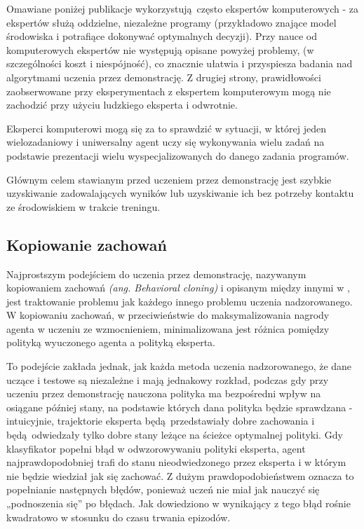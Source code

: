 Omawiane poniżej publikacje wykorzystują często ekspertów komputerowych - za ekspertów służą oddzielne, niezależne programy (przykładowo znające model środowiska i potrafiące dokonywać optymalnych decyzji). Przy nauce od komputerowych ekspertów nie występują opisane powyżej problemy, (w szczególności koszt i niespójność), co znacznie ułatwia i przyspiesza badania nad algorytmami uczenia przez demonstrację. Z drugiej strony, prawidłowości zaobserwowane przy eksperymentach z ekspertem komputerowym mogą nie zachodzić przy użyciu ludzkiego eksperta i odwrotnie.

Eksperci komputerowi mogą się za to sprawdzić w sytuacji, w której jeden wielozadaniowy i uniwersalny agent uczy się wykonywania wielu zadań na podstawie prezentacji wielu wyspecjalizowanych do danego zadania programów.

Głównym celem stawianym przed uczeniem przez demonstrację jest szybkie uzyskiwanie zadowalających wyników lub uzyskiwanie ich bez potrzeby kontaktu ze środowiskiem w trakcie treningu.

\subsection{Kopiowanie zachowań}\label{bcloning}

Najprostszym podejściem do uczenia przez demonstrację, nazywanym kopiowaniem zachowań \textit{(ang. Behavioral cloning)} i opisanym między innymi w \cite{Schaal99isimitation}, jest traktowanie problemu jak każdego innego problemu uczenia nadzorowanego. W kopiowaniu zachowań, w przeciwieństwie do maksymalizowania nagrody agenta w uczeniu ze wzmocnieniem, minimalizowana jest różnica pomiędzy polityką wyuczonego agenta a polityką eksperta.

To podejście zakłada jednak, jak każda metoda uczenia nadzorowanego, że dane uczące i testowe są niezależne i mają jednakowy rozkład, podczas gdy przy uczeniu przez demonstrację nauczona polityka ma bezpośredni wpływ na osiągane później stany, na podstawie których dana polityka będzie sprawdzana - intuicyjnie, trajektorie eksperta będą przedstawiały dobre zachowania i będą odwiedzały tylko dobre stany leżące na ścieżce optymalnej polityki. Gdy klasyfikator popełni błąd w odwzorowywaniu polityki eksperta, agent najprawdopodobniej trafi do stanu nieodwiedzonego przez eksperta i w którym nie będzie wiedział jak się zachować. Z dużym prawdopodobieństwem oznacza to popełnianie następnych błędów, ponieważ uczeń nie miał jak nauczyć się „podnoszenia się” po błędach. Jak dowiedziono w \cite{bagnell2010efficient} wynikający z tego błąd rośnie kwadratowo w stosunku do czasu trwania epizodów.

